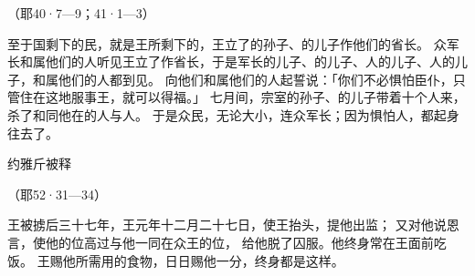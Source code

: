 {\par }{\R （耶40·7—9；41·1—3）
\par }{\PP {}至于{}国剩下的民，就是{}王{}所剩下的，{}王立了{}的孙子、{}的儿子{}作他们的省长。
众军长和属他们的人听见{}王立了{}作省长，于是军长{}的儿子{}、{}的儿子{}、{}人{}的儿子{}、{}人的儿子{}，和属他们的人都到{}见{}。
向他们和属他们的人起誓说：「你们不必惧怕{}臣仆，只管住在这地服事{}王，就可以得福。」
七月间，宗室{}的孙子、{}的儿子{}带着十个人来，杀了{}和同他在{}的{}人与{}人。
于是众民，无论大小，连众军长；因为惧怕{}人，都起身往{}去了。
\par }{\SH 约雅斤被释
\par }{\R （耶52·31—34）
\par }{\PP {}王{}被掳后三十七年，{}王{}元年十二月二十七日，使{}王{}抬头，提他出监；
又对他说恩言，使他的位高过与他一同在{}众王的位，
给他脱了囚服。他终身常在{}王面前吃饭。
王赐他所需用的食物，日日赐他一分，终身都是这样。
\par }